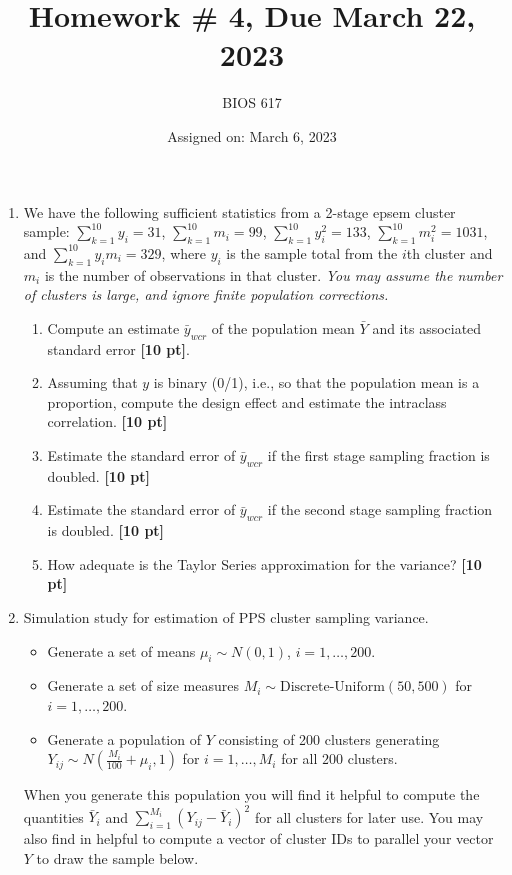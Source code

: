 \documentclass[12pt]{article}
\begin{document}
\title{Homework \# 4, Due March 22, 2023}
\author{BIOS 617}
\date{Assigned on: March 6, 2023}

\maketitle

\begin{enumerate}
\setlength{\itemsep}{15pt}%
\setlength{\parskip}{15pt}%

\item  We have the following sufficient statistics from a 2-stage epsem cluster sample: $\sum_{k=1}^{10} y_i = 31$, $\sum_{k=1}^{10} m_i = 99$, $\sum_{k=1}^{10} y_i^2 = 133$, $\sum_{k=1}^{10} m_i^2 = 1031$, and $\sum_{k=1}^{10} y_i m_i = 329$, where $y_i$ is the sample total from the $i$th cluster and $m_i$ is the number of observations in that cluster.  {\it You may assume the number of clusters is large, and ignore finite population corrections.}
	\begin{enumerate}[itemsep=5ex]
	\item Compute an estimate $\bar y_{wcr}$ of the population mean $\bar Y$ and its associated standard error {\bf [10 pt]}.
	\item Assuming that $y$ is binary (0/1), i.e., so that the population mean is a proportion, compute the design effect and estimate the intraclass correlation. {\bf [10 pt]}
	\item Estimate the standard error of $\bar y_{wcr}$ if the first stage sampling fraction is doubled. {\bf [10 pt]}
	\item Estimate the standard error of $\bar y_{wcr}$ if the second stage sampling fraction is doubled. {\bf [10 pt]}
	\item How adequate is the Taylor Series approximation for the variance? {\bf [10 pt]}
	\end{enumerate}
	\pagebreak

\item  Simulation study for estimation of PPS cluster sampling variance.
\begin{itemize}
\item Generate a set of means $\mu_i \sim N(0,1)$, $i=1,\ldots,200$.
\item Generate a set of size measures $M_i \sim \text{Discrete-Uniform} (50,500)$ for $i=1,\ldots,200$.
\item Generate a population of $Y$ consisting of 200 clusters generating $Y_{ij} \sim N \left( \frac{M_i}{100} + \mu_i, 1 \right)$ for $i=1,\ldots,M_i$ for all $200$ clusters.
\end{itemize}
When you generate this population you will find it helpful to compute the quantities $\bar Y_i$ and $\sum_{i=1}^{M_i} (Y_{ij} - \bar Y_i)^2$ for all clusters for later use.  You may also find in helpful to compute a vector of cluster IDs to parallel your vector $Y$ to draw the sample below.




\end{enumerate}
\end{document}

